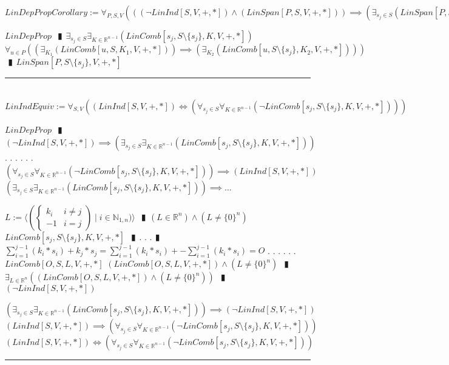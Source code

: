 \documentclass{book}
\newcommand{\abr}{:=}
\newcommand{\cont}{\phantom{.}. . .\phantom{.}}
\newcommand{\pipe}{$\phantom{(}\vrectangleblack\phantom{)}$}
\newcommand{\st}{\mathbin{|}}
\begin{document}
$LinDepPropCorollary \abr \forall_{P, S, V}(((\lnot LinInd[S, V, +, *]) \land (LinSpan[P, S, V, +, *])) \implies (\exists_{s_j \in S}(LinSpan[P, S \setminus \{s_j\}, V, +, *])))$
\begin{enumerate}
  \lit $LinDepProp$ \pipe $\exists_{s_j \in S} \exists_{K \in \mathbb{R}^{n - 1}}(LinComb[s_j, S \setminus \{s_j\}, K, V, +, *])$
  \lit $\forall_{u \in P}((\exists_{K_1}(LinComb[u, S, K_1, V, +, *])) \implies (\exists_{K_2}(LinComb[u, S \setminus \{s_j\}, K_2, V, +, *])))$ \pipe $LinSpan[P, S \setminus \{s_j\}, V, +, *]$
\end{enumerate} \vspace{.75mm} \hrule \vspace{.75mm} \ \\ 

$LinIndEquiv \abr \forall_{S, V}((LinInd[S, V, +, *]) \iff (\forall_{s_j \in S} \forall_{K \in \mathbb{R}^{n - 1}}(\lnot LinComb[s_j, S \setminus \{s_j\}, K, V, +, *])))$
\begin{enumerate}
  \lit $LinDepProp$ \pipe $(\lnot LinInd[S, V, +, *]) \implies (\exists_{s_j \in S} \exists_{K \in \mathbb{R}^{n - 1}}(LinComb[s_j, S \setminus \{s_j\}, K, V, +, *]))$ \cont
  \lit \cont $(\forall_{s_j \in S} \forall_{K \in \mathbb{R}^{n - 1}}(\lnot LinComb[s_j, S \setminus \{s_j\}, K, V, +, *])) \implies (LinInd[S, V, +, *])$
  \lit $(\exists_{s_j \in S} \exists_{K \in \mathbb{R}^{n - 1}}(LinComb[s_j, S \setminus \{s_j\}, K, V, +, *])) \implies \ldots$
  \begin{enumerate}
    \lit $L \abr \langle \left(\begin{cases} 
      k_i & i \neq j \\
      -1 & i = j 
    \end{cases}\right) \st i \in \mathbb{N}_{1, n}) \rangle$ \pipe $(L \in \mathbb{R}^n) \land (L \neq \{0\}^n)$
    \lit $LinComb[s_j, S \setminus \{s_j\}, K, V, +, *]$ \pipe \cont  \pipe $\sum_{i = 1}^{j - 1}(k_i * s_i) + k_j * s_j = \sum_{i = 1}^{j - 1}(k_i * s_i) + -\sum_{i = 1}^{j - 1}(k_i * s_i) = O$ \cont
    \lit \cont $LinComb[O, S, L, V, +, *]$
    \lit $(LinComb[O, S, L, V, +, *]) \land (L \neq \{0\}^n)$ \pipe $\exists_{L \in \mathbb{R}^n}((LinComb[O, S, L, V, +, *]) \land (L \neq \{0\}^n))$ \pipe $(\lnot LinInd[S, V, +, *])$
  \end{enumerate}
  \lit $(\exists_{s_j \in S} \exists_{K \in \mathbb{R}^{n - 1}}(LinComb[s_j, S \setminus \{s_j\}, K, V, +, *])) \implies (\lnot LinInd[S, V, +, *])$
  \lit $(LinInd[S, V, +, *]) \implies (\forall_{s_j \in S} \forall_{K \in \mathbb{R}^{n - 1}}(\lnot LinComb[s_j, S \setminus \{s_j\}, K, V, +, *]))$
  \lit $(LinInd[S, V, +, *]) \iff (\forall_{s_j \in S} \forall_{K \in \mathbb{R}^{n - 1}}(\lnot LinComb[s_j, S \setminus \{s_j\}, K, V, +, *]))$
\end{enumerate} \vspace{.75mm} \hrule \vspace{.75mm} \ \\ 
\end{document}
